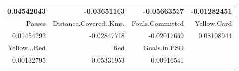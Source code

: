 {\begin{enumerate}[a)]
\begin{table}[H]
\begin{tabular}{rrrr}
			0.04542043 & -0.03651103 & -0.05663537 & -0.01282451   \\
			\hline
			Passes & Distance.Covered..Kms. & Fouls.Committed & Yellow.Card   \\

			0.01454292 & -0.02847718 & -0.02017669 & 0.08108944  \\
			\hline
			Yellow...Red & Red & Goals.in.PSO &   \\

			-0.00132795 & -0.05331953 & 0.00916541 & \\
			\hline
		\end{tabular} 
	\end{table}	
\end{enumerate} 
}
